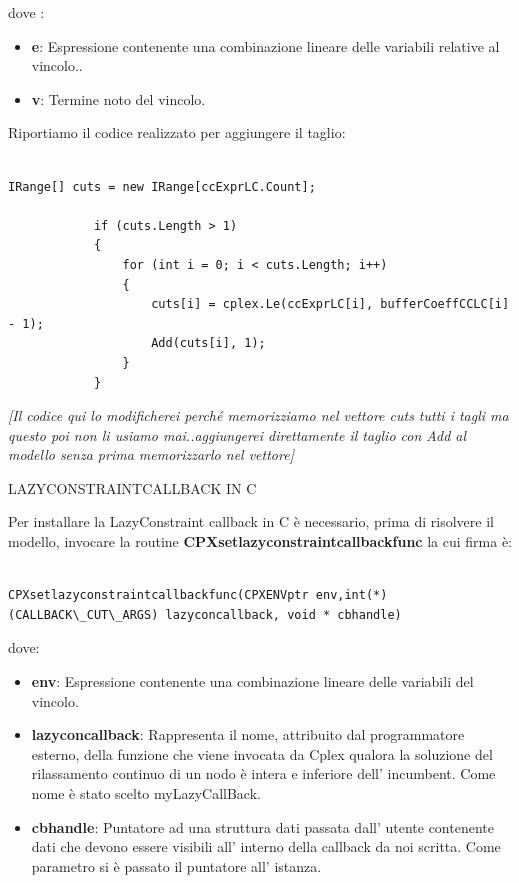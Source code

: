 \documentclass[11pt]{article}
\begin{document}
dove :

\begin{itemize}
	\item \textbf{e}: Espressione contenente una combinazione lineare delle variabili relative al vincolo..
	\item \textbf{v}: Termine noto del vincolo. 
\end{itemize}


Riportiamo il codice realizzato per aggiungere il taglio:


\begin{lstlisting}

IRange[] cuts = new IRange[ccExprLC.Count];

            if (cuts.Length > 1)
            {
                for (int i = 0; i < cuts.Length; i++)
                {
                    cuts[i] = cplex.Le(ccExprLC[i], bufferCoeffCCLC[i] - 1);
                    Add(cuts[i], 1);
                }
            }

\end{lstlisting}


\textit{[Il codice qui lo modificherei perché memorizziamo nel vettore cuts tutti i tagli ma questo poi non li usiamo mai..aggiungerei direttamente il taglio con Add al modello senza prima memorizzarlo nel vettore]}


\vspace{2\baselineskip}
LAZYCONSTRAINTCALLBACK IN C
\vspace{2\baselineskip}



Per installare la LazyConstraint callback in C è necessario, prima di risolvere il modello, invocare la routine \textbf{CPXsetlazyconstraintcallbackfunc} la cui firma è:

\begin{lstlisting}

CPXsetlazyconstraintcallbackfunc(CPXENVptr env,int(*)(CALLBACK\_CUT\_ARGS) lazyconcallback, void * cbhandle)

\end{lstlisting}



dove:

\begin{itemize}
	\item \textbf{env}: Espressione contenente una combinazione lineare delle variabili del vincolo.
	\item \textbf{lazyconcallback}: Rappresenta il nome, attribuito dal programmatore esterno, della funzione che viene invocata da Cplex qualora la soluzione del rilassamento continuo di un 										nodo è intera e inferiore dell' incumbent. Come nome è stato scelto myLazyCallBack.
	\item \textbf{cbhandle}: Puntatore ad una struttura dati passata dall' utente contenente dati che devono essere visibili all' interno della callback da noi scritta. Come parametro si è 								 passato il puntatore all' istanza. 
\end{itemize}
\end{document}
